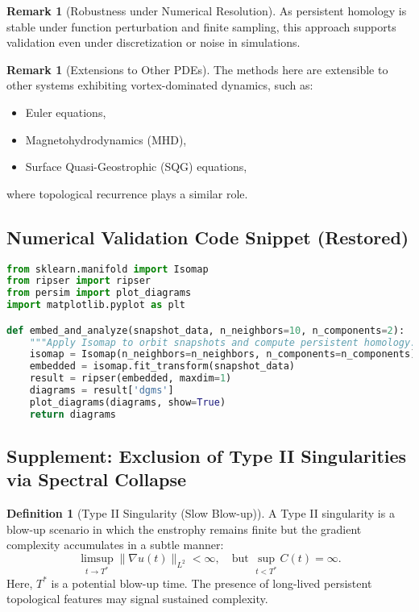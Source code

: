 \documentclass[11pt]{article}
\theoremstyle{definition}
\newtheorem{definition}[theorem]{Definition}
\newtheorem{remark}[theorem]{Remark}
\begin{document}
\begin{remark}[Robustness under Numerical Resolution]
As persistent homology is stable under function perturbation and finite sampling, this approach supports validation even under discretization or noise in simulations.
\end{remark}

\begin{remark}[Extensions to Other PDEs]
The methods here are extensible to other systems exhibiting vortex-dominated dynamics, such as:
\begin{itemize}
  \item Euler equations,
  \item Magnetohydrodynamics (MHD),
  \item Surface Quasi-Geostrophic (SQG) equations,
\end{itemize}
where topological recurrence plays a similar role.
\end{remark}

\subsection*{Numerical Validation Code Snippet (Restored)}

\begin{lstlisting}[language=Python, caption=Isomap + Persistent Homology Validation for Navier--Stokes Orbit Geometry]
from sklearn.manifold import Isomap
from ripser import ripser
from persim import plot_diagrams
import matplotlib.pyplot as plt

def embed_and_analyze(snapshot_data, n_neighbors=10, n_components=2):
    """Apply Isomap to orbit snapshots and compute persistent homology."""
    isomap = Isomap(n_neighbors=n_neighbors, n_components=n_components)
    embedded = isomap.fit_transform(snapshot_data)
    result = ripser(embedded, maxdim=1)
    diagrams = result['dgms']
    plot_diagrams(diagrams, show=True)
    return diagrams
\end{lstlisting}


\subsection*{Supplement: Exclusion of Type II Singularities via Spectral Collapse}

\begin{definition}[Type II Singularity (Slow Blow-up)]
A Type II singularity is a blow-up scenario in which the enstrophy remains finite but the gradient complexity accumulates in a subtle manner:
\[
\limsup_{t \to T^*} \|\nabla u(t)\|_{L^2} < \infty, \quad \text{but } \sup_{t<T^*} C(t) = \infty.
\]
Here, $T^*$ is a potential blow-up time. The presence of long-lived persistent topological features may signal sustained complexity.
\end{definition}
\end{document}
